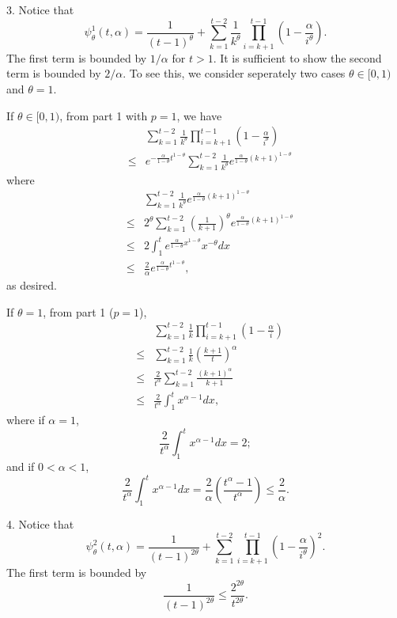 \documentclass[twoside,twocolumn,journal]{IEEEtran}
\newenvironment{pf}[1][Proof]{\medskip\noindent\hspace{1em}{\itshape #1: }}{\hspace*{\fill}~\QED\par\endtrivlist\medskip}
\begin{document}
\begin{pf}
3. Notice that
\[ \psi^1_\theta(t,\alpha)= \frac{1}{(t-1)^\theta} + \sum_{k=1}^{t-2} \frac{1}{k^\theta}\prod_{i=k+1}^{t-1} \left(1-\frac{\alpha}{i^\theta}\right). \]
The first term is bounded by $1/\alpha$ for $t>1$. It is sufficient to show the second term is bounded by $2/\alpha$. To see this, we consider seperately
two cases $\theta\in [0,1)$ and $\theta=1$.

If $\theta\in [0,1)$, from part 1 with $p=1$, we have
\begin{eqnarray*}
& & \sum_{k=1}^{t-2} \frac{1}{k^\theta}\prod_{i=k+1}^{t-1} \left(1-\frac{\alpha}{i^\theta}\right) \\
& \leq & e^{-\frac{\alpha}{1-\theta}t^{1-\theta}} \sum_{k=1}^{t-2} \frac{1}{k^\theta}e^{\frac{\alpha}{1-\theta} (k+1)^{1-\theta}}
\end{eqnarray*}
where
\begin{eqnarray*}
& & \sum_{k=1}^{t-2} \frac{1}{k^\theta}e^{\frac{\alpha}{1-\theta} (k+1)^{1-\theta}} \\ & \leq & 2^\theta \sum_{k=1}^{t-2}
\left(\frac{1}{k+1}\right)^\theta e^{\frac{\alpha}{1-\theta} (k+1)^{1-\theta}} \\
& \leq & 2 \int_1^{t}  e^{\frac{\alpha}{1-\theta} x^{1-\theta}} x^{-\theta} d x \\
& \leq & \frac{2}{\alpha} e^{\frac{\alpha}{1-\theta}t^{1-\theta}},
\end{eqnarray*}
as desired.


If $\theta=1$, from part 1 ($p=1$),
\begin{eqnarray*}
& & \sum_{k=1}^{t-2} \frac{1}{k} \prod_{i=k+1}^{t-1} \left( 1 - \frac{\alpha}{i} \right) \\
& \leq & \sum_{k=1}^{t-2} \frac{1}{k}\left(\frac{k+1}{t}\right)^\alpha \\
& \leq & \frac{2}{t^\alpha} \sum_{k=1}^{t-2} \frac{(k+1)^\alpha}{k+1} \\
& \leq  & \frac{2}{t^\alpha} \int_1^{t} x^{\alpha-1} d x,
\end{eqnarray*}
where if $\alpha=1$,
\[ \frac{2}{t^\alpha} \int_1^{t} x^{\alpha-1} d x = 2; \]
and if $0<\alpha<1$,
\[ \frac{2}{t^\alpha} \int_1^{t} x^{\alpha-1} d x = \frac{2}{\alpha}\left(\frac{t^\alpha-1}{t^\alpha}\right) \leq \frac{2}{\alpha}.\]

4. Notice that
\[ \psi^2_\theta(t,\alpha) = \frac{1}{(t-1)^{2\theta}} + \sum_{k=1}^{t-2} \prod_{i=k+1}^{t-1}\left(1-\frac{\alpha}{i^\theta}\right)^2. \]
The first term is bounded by
\[ \frac{1}{(t-1)^{2\theta}} \leq \frac{2^{2\theta}}{t^{2\theta}}. \]


\end{pf}
\end{document}
